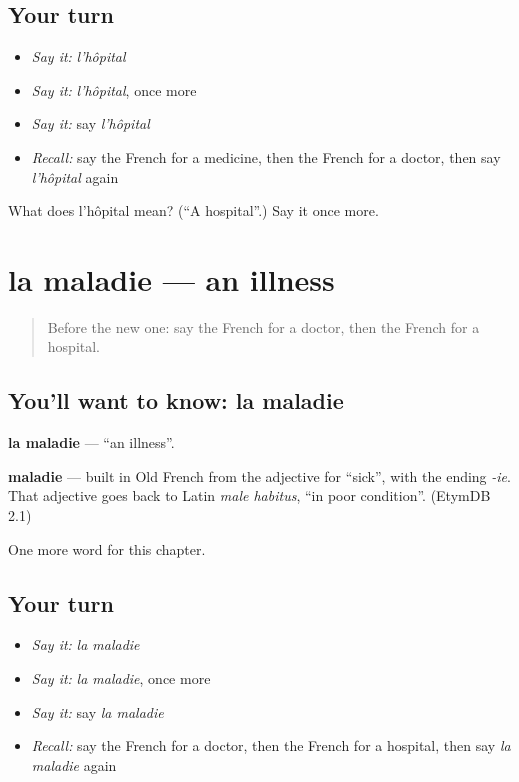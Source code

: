 \subsection*{Your turn}
\begin{itemize}
\raggedright
  \item \emph{Say it:} \emph{l'hôpital}
  \item \emph{Say it:} \emph{l'hôpital}, once more
  \item \emph{Say it:} say \emph{l'hôpital}
  \item \emph{Recall:} say the French for a medicine, then the French for a doctor, then say \emph{l'hôpital} again
\end{itemize}

\begin{tcolorbox}[breakable,colback=teal!4,colframe=teal!35!black,title={Before you move on}]
What does l'hôpital mean? (\textquotedblleft{}A hospital\textquotedblright{}.) Say it once more.
\end{tcolorbox}
\section[la maladie]{la maladie — an illness}

\label{lesson:FR-C54-maladie}



\begin{quote}
Before the new one: say the French for a doctor, then the French for a hospital.
\end{quote}

\subsection*{You'll want to know: la maladie}
\textbf{la maladie} — \textquotedblleft{}an illness\textquotedblright{}.

\begin{cousinweb}
\textbf{maladie} — built in Old French from the adjective for \textquotedblleft{}sick\textquotedblright{}, with the ending \emph{-ie}. That adjective goes back to Latin \emph{male habitus}, \textquotedblleft{}in poor condition\textquotedblright{}. (EtymDB 2.1)
\end{cousinweb}

\begin{grammarlens}[title={What you've built}]
One more word for this chapter.
\end{grammarlens}

\subsection*{Your turn}
\begin{itemize}
\raggedright
  \item \emph{Say it:} \emph{la maladie}
  \item \emph{Say it:} \emph{la maladie}, once more
  \item \emph{Say it:} say \emph{la maladie}
  \item \emph{Recall:} say the French for a doctor, then the French for a hospital, then say \emph{la maladie} again
\end{itemize}

